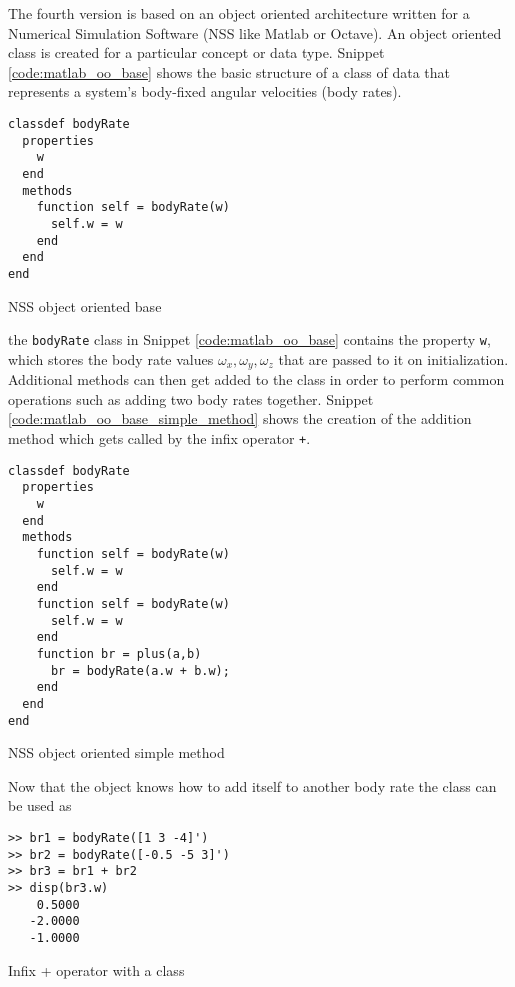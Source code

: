 The fourth version is based on an object oriented architecture written for a Numerical Simulation Software (NSS like Matlab or Octave).  An object oriented class is created for a particular concept or data type.  Snippet \ref{code:matlab_oo_base} shows the basic structure of a class of data that represents a system's body-fixed angular velocities (body rates).
\begin{listing}[H]
\begin{singlespace}
  \begin{verbatim}
classdef bodyRate
  properties
    w
  end
  methods
    function self = bodyRate(w)
      self.w = w
    end
  end
end
  \end{verbatim}
\caption{NSS object oriented base}
\label{code:matlab_oo_base}
\nocite{minted}
\end{singlespace}
\end{listing}
the \verb|bodyRate| class in Snippet \ref{code:matlab_oo_base} contains the property \verb|w|, which stores the body rate values $\omega_x, \omega_y, \omega_z$ that are passed to it on initialization.  Additional methods can then get added to the class in order to perform common operations such as adding two body rates together.  Snippet \ref{code:matlab_oo_base_simple_method} shows the creation of the addition method which gets called by the infix operator \verb|+|.
\begin{listing}[H]
\begin{singlespace}
  \begin{verbatim}
classdef bodyRate
  properties
    w
  end
  methods
    function self = bodyRate(w)
      self.w = w
    end
    function self = bodyRate(w)
      self.w = w
    end
    function br = plus(a,b)
      br = bodyRate(a.w + b.w);
    end
  end
end
  \end{verbatim}
\caption{NSS object oriented simple method}
\label{code:matlab_oo_base_simple_method}
\nocite{minted}
\end{singlespace}
\end{listing}
Now that the object knows how to add itself to another body rate the class can be used as
\begin{listing}[H]
\begin{singlespace}
  \begin{verbatim}
>> br1 = bodyRate([1 3 -4]')
>> br2 = bodyRate([-0.5 -5 3]')
>> br3 = br1 + br2
>> disp(br3.w)
    0.5000
   -2.0000
   -1.0000
  \end{verbatim}
\caption{Infix + operator with a class}
\label{code:add_body_rates}
\nocite{minted}
\end{singlespace}
\end{listing}

